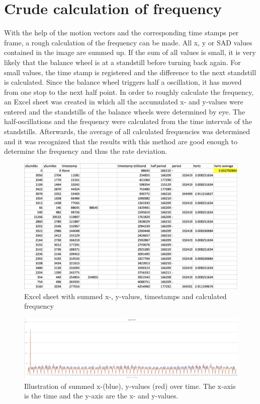 \documentclass[12pt, a4paper]{report}
\begin{document}
    \section{Crude calculation of frequency}
    With the help of the motion vectors and the corresponding time stamps per frame, a rough calculation of the frequency can be made. All x, y or SAD values contained in the image are summed up. If the sum of all values is small, it is very likely that the balance wheel is at a standstill before turning back again. For small values, the time stamp is registered and the difference to the next standstill is calculated. Since the balance wheel triggers half a oscillation, it has moved from one stop to the next half point. 
    In order to roughly calculate the frequency, an Excel sheet was created in which all the accumulated x- and y-values were entered and the standstills of the balance wheels were determined by eye. The half-oscillations and the frequency were calculated from the time intervals of the standstills. Afterwards, the average of all calculated frequencies was determined and it was recognized that the results with this method are good enough to determine the frequency and thus the rate deviation. 
    
    \noindent
    \begin{figure}[H]
    \centering
    \includegraphics[scale=0.45]{Images/excel_sheet_numbers.png}
    
    \caption{Excel sheet with summed x-, y-values, timestamps and calculated frequency}
    \end{figure}

    \noindent
    \begin{figure}[H]
    \centering
    \includegraphics[scale=0.35]{Images/excel_sheet_graph.png}
    
    \caption{Illustration of summed x-(blue), y-values (red) over time. The x-axis is the time and the y-axis are the x- and y-values.}
    \end{figure}
    
\end{document}
